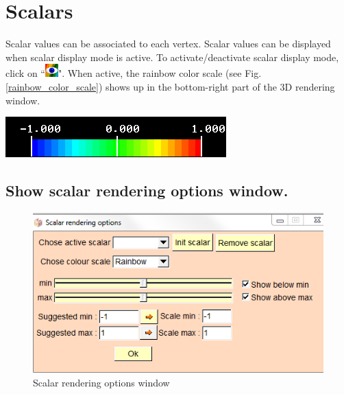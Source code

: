 
\chapter{Scalars}
\minitoc 

\noindent
\begin{minipage}{0.5\textwidth}
Scalar values can be associated to each vertex. Scalar values can be displayed when scalar display mode is active. To activate/deactivate scalar display mode, click on ``\includegraphics[scale=0.7]{images/pixmap/show_color_scale.png}".
When active, the rainbow color scale (see Fig. \ref{rainbow_color_scale}) shows up in the
bottom-right part of the 3D rendering window.
\end{minipage}    
\begin{minipage}{0.5\textwidth}\centering
  \includegraphics[scale=0.5]{images/Scalars_renreding/color_scale.png}
\label{rainbow_color_scale}
 \end{minipage} 
\noindent


\section{Show scalar rendering options window.}


\begin{figure}
  \centering
  \includegraphics[scale=0.5]{images/Scalars_renreding/color_scale_rendering_window.png}
\caption{Scalar rendering options window}	
\label{Scalar_rendering_options_window}
 \end{figure}


